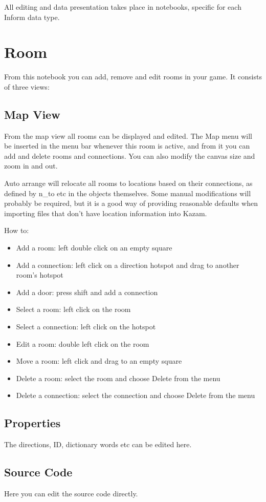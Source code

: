 All editing and data presentation takes place in notebooks, specific for each Inform data type. 

\section{Room}\label{roomnotebook}
From this notebook you can add, remove and edit rooms in your game. It consists of three views:

\subsection{Map View}\label{mapview}
From the map view all rooms can be displayed and edited. The Map menu will be inserted
in the menu bar whenever this room is active, and from it you can add and delete rooms
and connections. You can also modify the canvas size and zoom in and out.

Auto arrange will relocate all rooms to locations based on their connections, as defined
by n_to etc in the objects themselves. Some manual modifications will probably be required,
but it is a good way of providing reasonable defaults when importing files that
don't have location information into Kazam.

How to:
\begin{itemize}
\item Add a room: left double click on an empty square
\item Add a connection: left click on a direction hotspot and drag to another room's hotspot
\item Add a door: press shift and add a connection
\item Select a room: left click on the room
\item Select a connection: left click on the hotspot
\item Edit a room: double left click on the room
\item Move a room: left click and drag to an empty square
\item Delete a room: select the room and choose Delete from the menu
\item Delete a connection: select the connection and choose Delete from the menu
\end{itemize}

\subsection{Properties}\label{roomproperties}
The directions, ID, dictionary words etc can be edited here.

\subsection{Source Code}\label{roomsource}
Here you can edit the source code directly.

%
\setfooter{\thepage}{}{}{}{}{\thepage}%
\printindex%


